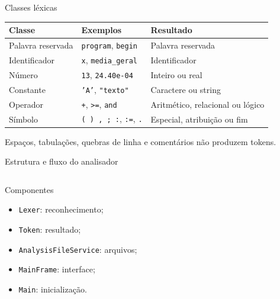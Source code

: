 \documentclass[aspectratio=169,11pt]{beamer}
\begin{document}
\begin{frame}{Classes léxicas}
  \small
  \begin{tabularx}{\textwidth}{p{3.1cm}Y Y}
    \toprule
    \textbf{Classe} & \textbf{Exemplos} & \textbf{Resultado} \\
    \midrule
    Palavra reservada & \texttt{program}, \texttt{begin} & Palavra reservada \\
    Identificador & \texttt{x}, \texttt{media\_geral} & Identificador \\
    Número & \texttt{13}, \texttt{24.40e-04} & Inteiro ou real \\
    Constante & \texttt{'A'}, \texttt{"texto"} & Caractere ou string \\
    Operador & \texttt{+}, \texttt{>=}, \texttt{and} & Aritmético, relacional ou lógico \\
    Símbolo & \texttt{( ) , ; :}, \texttt{:=}, \texttt{.} & Especial, atribuição ou fim \\
    \bottomrule
  \end{tabularx}

  \vspace{0.5em}
  \footnotesize Espaços, tabulações, quebras de linha e comentários não produzem tokens.
\end{frame}

\begin{frame}{Estrutura e fluxo do analisador}
  \begin{columns}[T,onlytextwidth]
      \begin{block}{Componentes}
        \begin{itemize}
          \item \texttt{Lexer}: reconhecimento;
          \item \texttt{Token}: resultado;
          \item \texttt{AnalysisFileService}: arquivos;
          \item \texttt{MainFrame}: interface;
          \item \texttt{Main}: inicialização.
        \end{itemize}
      \end{block}

      \centering
  \end{columns}
\end{frame}
\end{document}
